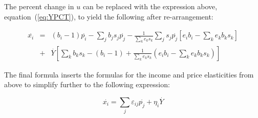 \noindent The percent change in $u$ can be replaced with the expression above, equation~(\ref{eq:YPCT}),
to yield the following after re-arrangement:

\[\begin{array}{*{20}{l}}
\overset{.}{x_i} & = & \displaystyle
\left(b_i - 1\right)\overset{.}{p_i} -
\sum\limits_j {b_j s_j \overset{.}{p_j}}  - \frac{1}{\sum\limits_k {e_k s_k}}
\sum\limits_j {s_j \overset{.}{p_j} \left[ e_i b_i - \sum\limits_k {{e_k}{b_k}{s_k}} \right]} \\
{}& + & \displaystyle
\overset{.}{Y}\left[ \sum\limits_k {b_k s_k}  - \left( b_i - 1 \right)
+ \frac{1}{\sum\limits_k {e_k s_k }} \left( e_i b_i - \sum\limits_k {e_k b_k s_k}  \right) \right]
\end{array}\]

\noindent The final formula inserts the formulas for the income and price elasticities from above to
simplify further to the following expression:

\begin{equation}
\label{eq:XPCT}
\overset{.}{x_i} = \displaystyle
\sum_j{\varepsilon_{ij}\overset{.}{p_j}} + \eta_i \overset{.}{Y}
\end{equation}
